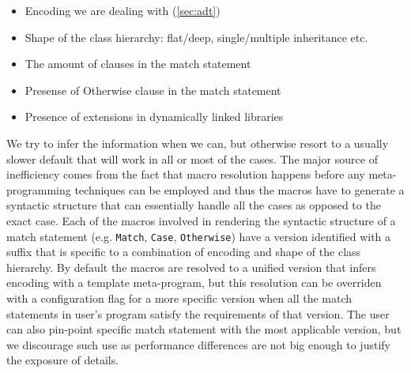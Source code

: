 \documentclass[preprint]{sigplanconf}
\makeatletter
\DeclareRobustCommand{\code}[1]{{\lstinline[breaklines=false,escapechar=@]{#1}}}
\makeatother
\begin{document}
\begin{itemize}
\item Encoding we are dealing with (\textsection\ref{sec:adt})
\item Shape of the class hierarchy: flat/deep, single/multiple inheritance etc.
\item The amount of clauses in the match statement
\item Presense of Otherwise clause in the match statement
\item Presence of extensions in dynamically linked libraries
\end{itemize}

We try to infer the information when we can, but otherwise resort to a usually 
slower default that will work in all or most of the cases. The major source of 
inefficiency comes from the fact that macro resolution happens before any 
meta-programming techniques can be employed and thus the macros have to generate 
a syntactic structure that can essentially handle all the cases as opposed to 
the exact case. Each of the macros involved in rendering the syntactic structure 
of a match statement (e.g. \code{Match}, \code{Case}, \code{Otherwise}) have a 
version identified with a suffix that is specific to a combination of encoding 
and shape of the class hierarchy. By default the macros are resolved to a 
unified version that infers encoding with a template meta-program, but this 
resolution can be overriden with a configuration flag for a more specific 
version when all the match statements in user's program satisfy the requirements 
of that version. The user can also pin-point specific match statement with the 
most applicable version, but we discourage such use as performance differences 
are not big enough to justify the exposure of details.
\end{document}
